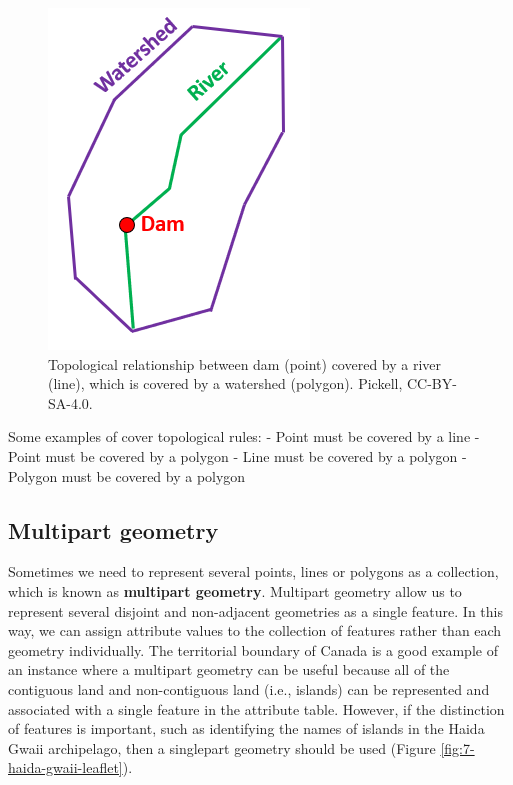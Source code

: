 \documentclass[
]{book}
\begin{document}
\begin{figure}
\includegraphics[width=0.75\linewidth]{images/07-dam-river-watershed} \caption{Topological relationship between dam (point) covered by a river (line), which is covered by a watershed (polygon). Pickell, CC-BY-SA-4.0.}\label{fig:7-dam-river-watershed}
\end{figure}

Some examples of cover topological rules:
- Point must be covered by a line
- Point must be covered by a polygon
- Line must be covered by a polygon
- Polygon must be covered by a polygon

\hypertarget{multipart-geometry}{%
\subsection{Multipart geometry}\label{multipart-geometry}}

Sometimes we need to represent several points, lines or polygons as a collection, which is known as \textbf{multipart geometry}. Multipart geometry allow us to represent several disjoint and non-adjacent geometries as a single feature. In this way, we can assign attribute values to the collection of features rather than each geometry individually. The territorial boundary of Canada is a good example of an instance where a multipart geometry can be useful because all of the contiguous land and non-contiguous land (i.e., islands) can be represented and associated with a single feature in the attribute table. However, if the distinction of features is important, such as identifying the names of islands in the Haida Gwaii archipelago, then a singlepart geometry should be used (Figure \ref{fig:7-haida-gwaii-leaflet}).
\end{document}
